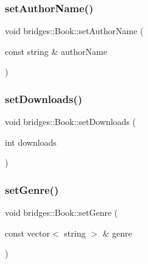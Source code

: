 \mbox{\label{classbridges_1_1_book_a4ca756815b519a0a4d1ae5d3b21aa2d2}} 
\subsubsection{\texorpdfstring{setAuthorName()}{setAuthorName()}}
{\footnotesize\ttfamily void bridges\+::\+Book\+::set\+Author\+Name (\begin{DoxyParamCaption}\item[{const string \&}]{author\+Name }\end{DoxyParamCaption})\hspace{0.3cm}{\ttfamily [inline]}}

\mbox{\label{classbridges_1_1_book_aa3e894e59ae043e7271861772b03632c}} 
\subsubsection{\texorpdfstring{setDownloads()}{setDownloads()}}
{\footnotesize\ttfamily void bridges\+::\+Book\+::set\+Downloads (\begin{DoxyParamCaption}\item[{int}]{downloads }\end{DoxyParamCaption})\hspace{0.3cm}{\ttfamily [inline]}}

\mbox{\label{classbridges_1_1_book_a3743b908548b944543af533b030a1eca}} 
\subsubsection{\texorpdfstring{setGenre()}{setGenre()}}
{\footnotesize\ttfamily void bridges\+::\+Book\+::set\+Genre (\begin{DoxyParamCaption}\item[{const vector$<$ string $>$ \&}]{genre }\end{DoxyParamCaption})\hspace{0.3cm}{\ttfamily [inline]}}

